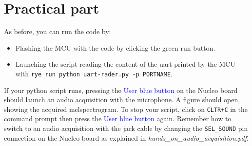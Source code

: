 \section{Practical part}
%
As before, you can run the code by:
\begin{itemize}
	\item Flashing the MCU with the code by clicking the green run button.
	\item Launching the script reading the content of the uart printed by the MCU with \texttt{rye run python uart-rader.py -p PORTNAME}.
\end{itemize}
If your python script runs, pressing the \textcolor{blue}{User blue button} on the Nucleo board should launch an audio acquisition with the microphone. A figure should open, showing the acquired melspectrogram. To stop your script, click on \texttt{CLTR+C} in the command prompt then press the \textcolor{blue}{User blue button} again.  Remember how to switch to an audio acquisition with the jack cable by changing the \texttt{SEL\_SOUND} pin connection on the Nucleo board as explained in \emph{hands\_on\_audio\_acquisition.pdf}.
%
